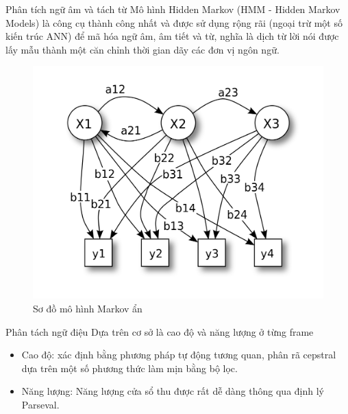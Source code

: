 \documentclass[notheorems, aspectratio=54]{beamer}
\begin{document}
\begin{frame}{Phân tích ngữ âm và tách từ}
	Mô hình Hidden Markov (HMM - Hidden Markov Models) là công cụ thành công nhất và được sử dụng rộng rãi (ngoại trừ một số kiến trúc ANN) để mã hóa ngữ âm, âm tiết và từ, nghĩa là dịch từ lời nói được lấy mẫu thành một căn chỉnh thời gian dãy các đơn vị ngôn ngữ.
	\begin{figure}[h!]
		\includegraphics[width=0.6\linewidth]{images/1024px-HiddenMarkovModel.svg.png}
		\caption{Sơ đồ mô hình Markov ẩn}
		\label{fig:writing-thesis}
	\end{figure}
	
\end{frame}
\begin{frame}{Phân tách ngữ điệu}
	Dựa trên cơ sở là cao độ và năng lượng ở từng frame
	\begin{itemize}
		\item Cao độ: xác định bằng phương pháp tự động tương quan, phân rã cepstral dựa trên một số phương thức làm mịn bằng bộ lọc.
		\item Năng lượng: Năng lượng cửa sổ thu được rất dễ dàng thông qua định lý Parseval.
	\end{itemize}
\end{frame}
\end{document}
